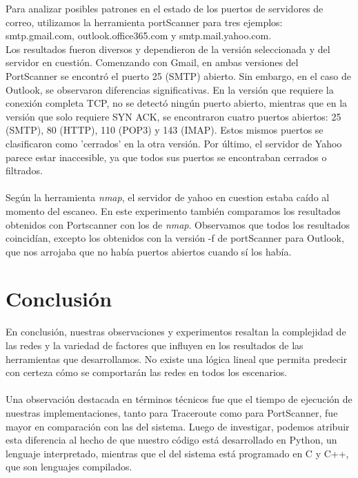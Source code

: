 \documentclass{article}
\begin{document}
    Para analizar posibles patrones en el estado de los puertos de servidores de correo, utilizamos la herramienta portScanner para tres ejemplos: smtp.gmail.com, outlook.office365.com y smtp.mail.yahoo.com. \\
    Los resultados fueron diversos y dependieron de la versión seleccionada y del servidor en cuestión. Comenzando con Gmail, en ambas versiones del PortScanner se encontró el puerto 25 (SMTP) abierto. Sin embargo, en el caso de Outlook, se observaron diferencias significativas. 
    En la versión que requiere la conexión completa TCP, no se detectó ningún puerto abierto, mientras que en la versión que solo requiere SYN ACK, se encontraron cuatro puertos abiertos: 25 (SMTP), 80 (HTTP), 110 (POP3) y 143 (IMAP). Estos mismos puertos se clasificaron como 'cerrados' en la otra versión.
    Por último, el servidor de Yahoo parece estar inaccesible, ya que todos sus puertos se encontraban cerrados o filtrados. \\
    \\
    Según la herramienta \textit{nmap}, el servidor de yahoo en cuestion estaba caído al momento del escaneo. En este experimento también comparamos los resultados obtenidos con Portscanner con los de \textit{nmap}. Observamos que todos los resultados coincidían, excepto los obtenidos con la versión -f de portScanner para Outlook, que nos arrojaba que no había puertos abiertos cuando sí los había.


\section{Conclusión}

En conclusión, nuestras observaciones y experimentos resaltan la complejidad de las redes y la variedad de factores que influyen en los resultados de las herramientas que desarrollamos. No existe una lógica lineal que permita predecir con certeza cómo se comportarán las redes en todos los escenarios. \\
\\
Una observación destacada en términos técnicos fue que el tiempo de ejecución de nuestras implementaciones, tanto para Traceroute como para PortScanner, fue mayor en comparación con las del sistema. Luego de investigar, podemos atribuir esta diferencia al hecho de que nuestro código está desarrollado en Python, un lenguaje interpretado, mientras que el del sistema está programado en C y C++, que son lenguajes compilados.
\end{document}
